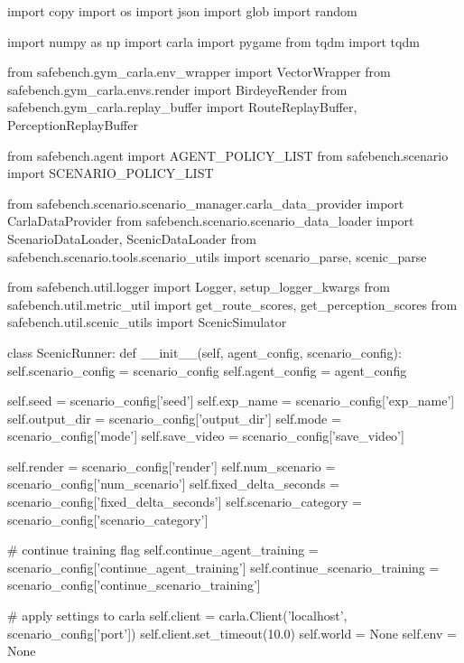 \begin{appendix}
import copy
import os
import json
import glob
import random

import numpy as np
import carla
import pygame
from tqdm import tqdm

from safebench.gym\_carla.env\_wrapper import VectorWrapper
from safebench.gym\_carla.envs.render import BirdeyeRender
from safebench.gym\_carla.replay\_buffer import RouteReplayBuffer, PerceptionReplayBuffer

from safebench.agent import AGENT\_POLICY\_LIST
from safebench.scenario import SCENARIO\_POLICY\_LIST

from safebench.scenario.scenario\_manager.carla\_data\_provider import CarlaDataProvider
from safebench.scenario.scenario\_data\_loader import ScenarioDataLoader, ScenicDataLoader
from safebench.scenario.tools.scenario\_utils import scenario\_parse, scenic\_parse

from safebench.util.logger import Logger, setup\_logger\_kwargs
from safebench.util.metric\_util import get\_route\_scores, get\_perception\_scores
from safebench.util.scenic\_utils import ScenicSimulator

class ScenicRunner:
def \_\_init\_\_(self, agent\_config, scenario\_config):
self.scenario\_config = scenario\_config
self.agent\_config = agent\_config

self.seed = scenario\_config['seed']
self.exp\_name = scenario\_config['exp\_name']
self.output\_dir = scenario\_config['output\_dir']
self.mode = scenario\_config['mode']
self.save\_video = scenario\_config['save\_video']

self.render = scenario\_config['render']
self.num\_scenario = scenario\_config['num\_scenario']
self.fixed\_delta\_seconds = scenario\_config['fixed\_delta\_seconds']
self.scenario\_category = scenario\_config['scenario\_category']

\# continue training flag
self.continue\_agent\_training = scenario\_config['continue\_agent\_training']
self.continue\_scenario\_training = scenario\_config['continue\_scenario\_training']

\# apply settings to carla
self.client = carla.Client('localhost', scenario\_config['port'])
self.client.set\_timeout(10.0)
self.world = None
self.env = None


\end{appendix}
